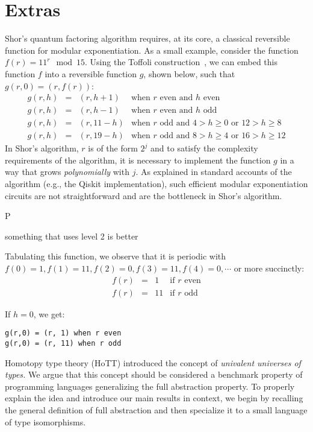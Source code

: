 \section{Extras}

Shor's quantum factoring algorithm requires, at its core, a classical reversible function for modular exponentiation. As
a small example, consider the function $f(r) = 11^{r} \mod 15$. Using the Toffoli construction~\cite{Toffoli:1980}, we
can embed this function $f$ into a reversible function $g$, shown below, such that $g(r,0) = (r,f(r))$:
\[\begin{array}{rcll}
g(r,h) &=& (r,h+1) & \mbox{when~$r$~even~and~$h$~even} \\
g(r,h) &=& (r,h-1) & \mbox{when~$r$~even~and~$h$~odd} \\
g(r,h) &=& (r,11-h) & \mbox{when~$r$~odd~and~$4 > h \geq 0$~or~$12 > h \geq 8$} \\
g(r,h) &=& (r,19-h) & \mbox{when~$r$~odd~and~$8 > h \geq 4$~or~$16 > h \geq 12$}
  \end{array}\]
In Shor's algorithm, $r$ is of the form $2^j$ and to satisfy the complexity requirements of the algorithm, it is
necessary to implement the function $g$ in a way that grows \emph{polynomially} with $j$. As explained in standard
accounts of the algorithm (e.g., the Qiskit implementation), such efficient modular exponentiation circuits are not
straightforward and are the bottleneck in Shor’s algorithm.

P~\cite{shorefficient}

something that uses level 2 is better



Tabulating this function, we observe that it is periodic with
$f(0) = 1, f(1) = 11, f(2) = 0, f(3) = 11, f(4) = 0, \cdots$ or more succinctly:
\[\begin{array}{rcll}
f(r) &=& 1 & \mbox{if~$r$~even} \\
f(r) &=& 11 & \mbox{if~$r$~odd}
\end{array}\]

If $h=0$, we get:

\begin{verbatim}
g(r,0) = (r, 1) when r even
g(r,0) = (r, 11) when r odd
\end{verbatim}

Homotopy type theory (HoTT) introduced the concept of \emph{univalent universes
  of types.} We argue that this concept should be considered a benchmark
property of programming languages generalizing the full abstraction property. To
properly explain the idea and introduce our main results in context, we begin by
recalling the general definition of full abstraction and then specialize it to a small
language of type isomorphisms.

